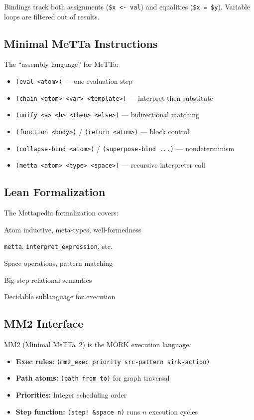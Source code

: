 \documentclass[11pt]{article}
\newcommand{\code}[1]{\texttt{#1}}
\newcommand{\MORK}{\textup{MORK}}
\newcommand{\MeTTa}{\textup{MeTTa}}
\begin{document}
Bindings track both assignments (\code{\$x <- val}) and equalities
(\code{\$x = \$y}).  Variable loops are filtered out of results.

\subsection{Minimal MeTTa Instructions}

The ``assembly language'' for MeTTa:
\begin{itemize}[nosep]
  \item \code{(eval <atom>)} --- one evaluation step
  \item \code{(chain <atom> <var> <template>)} --- interpret then substitute
  \item \code{(unify <a> <b> <then> <else>)} --- bidirectional matching
  \item \code{(function <body>)} / \code{(return <atom>)} --- block control
  \item \code{(collapse-bind <atom>)} / \code{(superpose-bind ...)} --- nondeterminism
  \item \code{(metta <atom> <type> <space>)} --- recursive interpreter call
\end{itemize}

\subsection{Lean Formalization}

The Mettapedia formalization covers:
\begin{description}[nosep]
\item[\code{HE/Syntax.lean}] Atom inductive, meta-types, well-formedness
\item[\code{HE/Eval.lean}] \code{metta}, \code{interpret\_expression}, etc.
\item[\code{HE/Space.lean}] Space operations, pattern matching
\item[\code{HE/DeclarativeSpec.lean}] Big-step relational semantics
\item[\code{HE/CoreFragment.lean}] Decidable sublanguage for execution
\end{description}

\subsection{MM2 Interface}

MM2 (Minimal \MeTTa{}~2) is the \MORK{} execution language:
\begin{itemize}[nosep]
  \item \textbf{Exec rules:} \code{(mm2\_exec priority src-pattern sink-action)}
  \item \textbf{Path atoms:} \code{(path from to)} for graph traversal
  \item \textbf{Priorities:} Integer scheduling order
  \item \textbf{Step function:} \code{(step! \&space n)} runs $n$ execution cycles
\end{itemize}
\end{document}
